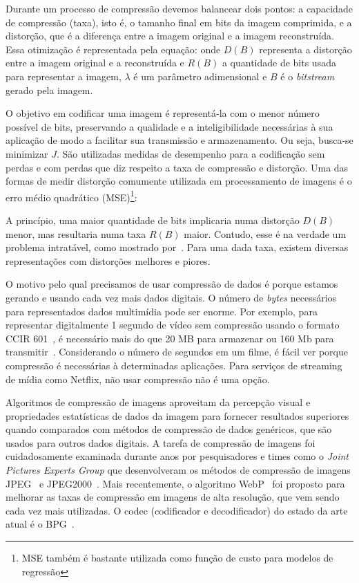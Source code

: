 Durante um processo de compressão devemos balancear dois pontos: a capacidade de compressão (taxa), isto é, o tamanho final em bits da imagem comprimida, e a distorção, que é a diferença entre a imagem original e a imagem reconstruída. Essa otimização é representada pela equação:  onde $D(B)$ representa a distorção entre a imagem original e a reconstruída e $R(B)$ a quantidade de bits usada para representar a imagem, $\lambda$ é um parâmetro adimensional e $B$ é o \textit{bitstream} gerado pela imagem.

O objetivo em codificar uma imagem é representá-la com o menor número possível de bits, preservando a qualidade e a inteligibilidade necessárias à sua aplicação de modo a facilitar sua transmissão e armazenamento. Ou seja, busca-se minimizar $J$. São utilizadas medidas de desempenho para a codificação sem perdas e com perdas que diz respeito a taxa de compressão e distorção. Uma das formas de medir distorção comumente utilizada em processamento de imagens é o erro médio quadrático (\acrshort{MSE})\footnote{MSE também é bastante utilizada como função de custo para modelos de regressão}: 
    
A princípio, uma maior quantidade de bits implicaria numa distorção $D(B)$ menor, mas resultaria numa taxa $R(B)$ maior. Contudo, esse é na verdade um problema intratável, como mostrado por~\cite{shoham1988}. Para uma dada taxa, existem diversas representações com distorções melhores e piores.

O motivo pelo qual precisamos de usar compressão de dados é porque estamos gerando e usando cada vez mais dados digitais. O número de \textit{bytes} necessários para representados dados multimídia pode ser enorme. Por exemplo, para representar digitalmente 1 segundo de vídeo sem compressão usando o formato CCIR 601~\cite{sayood2017introduction}, é necessário mais do que 20 MB para armazenar ou 160 Mb para transmitir~\cite{sayood2017introduction}. Considerando o número de segundos em um filme, é fácil ver porque compressão é necessárias à determinadas aplicações. Para serviços de streaming de mídia como Netflix, não usar compressão não é uma opção.

Algoritmos de compressão de imagens aproveitam da percepção visual e propriedades estatísticas de dados da imagem para fornecer resultados superiores quando comparados com métodos de compressão de dados genéricos, que são usados para outros dados digitais. A tarefa de compressão de imagens foi cuidadosamente examinada durante anos por pesquisadores e times como o \textit{Joint Pictures Experts Group} que desenvolveram os métodos de compressão de imagens JPEG~\cite{jpeg1993} e JPEG2000~\cite{jpeg2000}. Mais recentemente, o algoritmo WebP~\cite{webp} foi proposto para melhorar as taxas de compressão em imagens de alta resolução, que vem sendo cada vez mais utilizadas. O codec (codificador e decodificador) do estado da arte atual é o BPG~\cite{bpg}.

